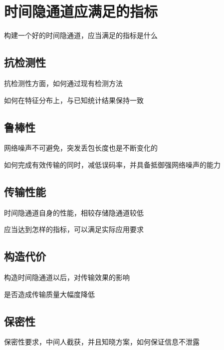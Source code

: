 \section{时间隐通道应满足的指标}
\label{chap:backinfo:metric}

构建一个好的时间隐通道，应当满足的指标是什么

\subsection{抗检测性}
\label{chap:backinfo:metric:undetectability}

抗检测性方面，如何通过现有检测方法

如何在特征分布上，与已知统计结果保持一致

\subsection{鲁棒性}
\label{chap:backinfo:metric:robustness}

网络噪声不可避免，突发丢包长度也是不断变化的

如何完成有效传输的同时，减低误码率，并具备抵御强网络噪声的能力

\subsection{传输性能}
\label{chap:backinfo:metric:throughput}

时间隐通道自身的性能，相较存储隐通道较低

应当达到怎样的指标，可以满足实际应用要求

\subsection{构造代价}
\label{chap:backinfo:metric:cost}

构造时间隐通道以后，对传输效果的影响

是否造成传输质量大幅度降低

\subsection{保密性}
\label{chap:backinfo:metric:non-disclosure}

保密性要求，中间人截获，并且知晓方案，如何保证信息不泄露